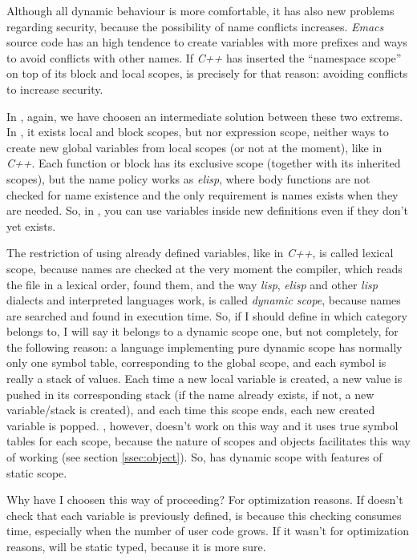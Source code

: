 \documentclass{article}
\begin{document}
Although all dynamic behaviour is more comfortable, it has also new problems
regarding security, because the possibility of name conflicts
increases. \textit{Emacs} source code has an high tendence to create variables
with more prefixes and ways to avoid conflicts with other names. If \textit{C++}
has inserted the ``namespace scope'' on top of its block and local scopes, is
precisely for that reason: avoiding conflicts to increase security.

In \faupp, again, we have choosen an intermediate solution between these two
extrems. In \faupp, it exists local and block scopes, but nor expression scope,
neither ways to create new global variables from local scopes (or not at the
moment), like in \textit{C++}. Each function or block has its exclusive scope
(together with its inherited scopes), but the name policy works as
\textit{elisp}, where body functions are not checked for name existence and the
only requirement is names exists when they are needed. So, in \faupp, you can
use variables inside new definitions even if they don't yet exists.

The restriction of using already defined variables, like in \textit{C++}, is
called lexical scope, because names are checked at the very moment the compiler,
which reads the file in a lexical order, found them, and the way
\textit{lisp}, \textit{elisp} and other \textit{lisp} dialects and interpreted
languages work, is called \textit{dynamic scope}, because names are searched and
found in execution time. So, if I should define in which category \faupp belongs
to, I will say it belongs to a dynamic scope one, but not completely, for the
following reason: a language implementing pure dynamic scope has normally only
one symbol table, corresponding to the global scope, and each symbol is really a
stack of values. Each time a new local variable is created, a new value is
pushed in its corresponding stack (if the name already exists, if not, a new
variable/stack is created), and each time this scope ends, each new created
variable is popped. \faupp, however, doesn't work on this way and it uses true
symbol tables for each scope, because the nature of \faupp scopes and objects
facilitates this way of working (see section \ref{ssec:object}). So, \faupp has
dynamic scope with features of static scope.

Why have I choosen this way of proceeding? For optimization reasons. If \faupp
doesn't check that each variable is previously defined, is because this checking
consumes time, especially when the number of user code grows. If it wasn't for
optimization reasons, \faupp will be static typed, because it is more sure.
\end{document}

